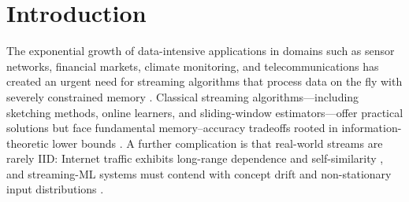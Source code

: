 \documentclass[sensors,article,submit,pdftex,moreauthors]{Definitions/mdpi}
\begin{document}
\section{Introduction}
\label{sec:intro}

The exponential growth of data-intensive applications in domains such as sensor networks, financial markets, climate monitoring, and telecommunications has created an urgent need for streaming algorithms that process data on the fly with severely constrained memory \citep{muthukrishnan2005data}. Classical streaming algorithms---including sketching methods, online learners, and sliding-window estimators---offer practical solutions but face fundamental memory--accuracy tradeoffs rooted in information-theoretic lower bounds \citep{alon1999space}. A further complication is that real-world streams are rarely IID: Internet traffic exhibits long-range dependence and self-similarity \citep{leland1994ethernet, willinger1997selfsimilarity}, and streaming-ML systems must contend with concept drift and non-stationary input distributions \citep{gama2014driftsurvey, arora2024driftreview, su2024elasticonline, yan2024bidynamic}.
\end{document}

